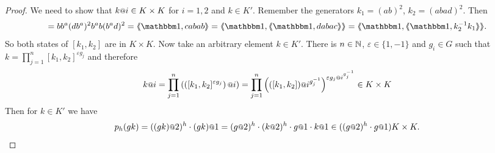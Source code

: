 \documentclass[a4paper,11pt]{amsart}
\begin{document}
\begin{proof}
We need to show that $k\at{i} \in K\times K$ for $i=1,2$ and $k\in K'$. Remember the generators $k_1=(ab)^2$, $k_2=(abad)^2$. Then 
\begin{align*}
 [k_1,k_2]=bb^a(db^a)^2b^ab(b^ad)^2 = \pair{\id,cabab}=\pair{\id,\pair{\id,dabac}}=\pair{\id,\pair{\id,k_2^{-1}k_1}}.
\end{align*}
So both states of $[k_1,k_2]$ are in $K\times K$. Now take an arbitrary element $k\in K'$.
There is $n\in\mathbb{N}$, $\varepsilon \in \{1,-1\}$ and $g_i\in G$ such that 
$k=\prod_{j=1}^n [k_1,k_2]^{\varepsilon g_j}$
and therefore 
\[k\at{i}=\prod_{j=1}^n\left( \left([k_1,k_2]^{\varepsilon g_j}\right)\at{i}\right)
	 = \prod_{j=1}^n \left(([k_1,k_2])\at{i^{g_j^{-1}}}\right)^{\varepsilon g_j\at{i^{g_j^{-1}}}}\in K\times K\]
 Then for $k\in K'$ we have
 \[p_h(gk) = ((gk)\at{2})^h\cdot (gk)\at{1} = (g\at{2})^h\cdot (k\at{2})^h\cdot g\at{1}\cdot k\at{1}\in ((g\at{2})^h\cdot g\at{1})K\times K.\]
\end{proof}
\end{document}
